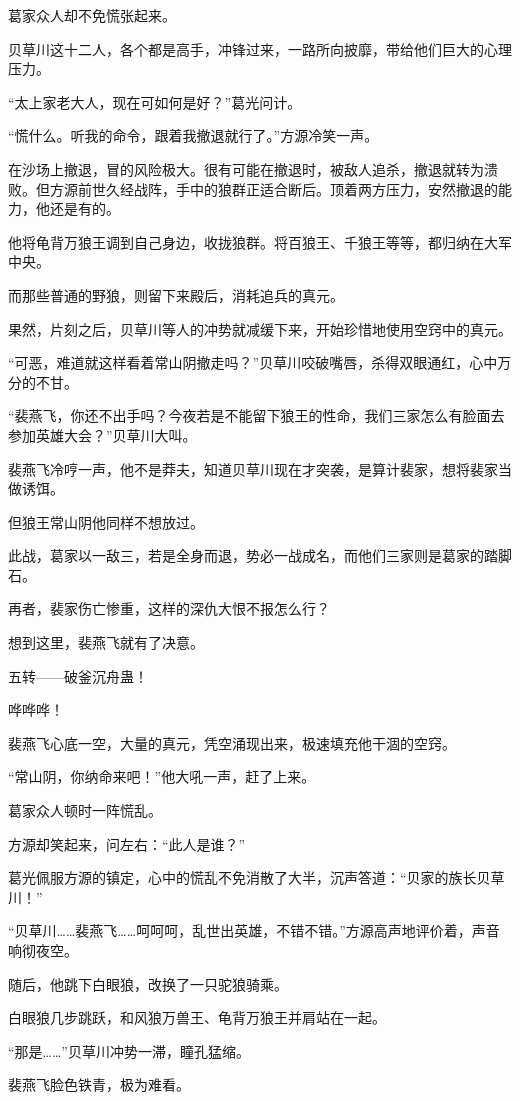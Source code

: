 \begin{this_body}
葛家众人却不免慌张起来。

贝草川这十二人，各个都是高手，冲锋过来，一路所向披靡，带给他们巨大的心理压力。

“太上家老大人，现在可如何是好？”葛光问计。

“慌什么。听我的命令，跟着我撤退就行了。”方源冷笑一声。

在沙场上撤退，冒的风险极大。很有可能在撤退时，被敌人追杀，撤退就转为溃败。但方源前世久经战阵，手中的狼群正适合断后。顶着两方压力，安然撤退的能力，他还是有的。

他将龟背万狼王调到自己身边，收拢狼群。将百狼王、千狼王等等，都归纳在大军中央。

而那些普通的野狼，则留下来殿后，消耗追兵的真元。

果然，片刻之后，贝草川等人的冲势就减缓下来，开始珍惜地使用空窍中的真元。

“可恶，难道就这样看着常山阴撤走吗？”贝草川咬破嘴唇，杀得双眼通红，心中万分的不甘。

“裴燕飞，你还不出手吗？今夜若是不能留下狼王的性命，我们三家怎么有脸面去参加英雄大会？”贝草川大叫。

裴燕飞冷哼一声，他不是莽夫，知道贝草川现在才突袭，是算计裴家，想将裴家当做诱饵。

但狼王常山阴他同样不想放过。

此战，葛家以一敌三，若是全身而退，势必一战成名，而他们三家则是葛家的踏脚石。

再者，裴家伤亡惨重，这样的深仇大恨不报怎么行？

想到这里，裴燕飞就有了决意。

五转——破釜沉舟蛊！

哗哗哗！

裴燕飞心底一空，大量的真元，凭空涌现出来，极速填充他干涸的空窍。

“常山阴，你纳命来吧！”他大吼一声，赶了上来。

葛家众人顿时一阵慌乱。

方源却笑起来，问左右：“此人是谁？”

葛光佩服方源的镇定，心中的慌乱不免消散了大半，沉声答道：“贝家的族长贝草川！”

“贝草川……裴燕飞……呵呵呵，乱世出英雄，不错不错。”方源高声地评价着，声音响彻夜空。

随后，他跳下白眼狼，改换了一只驼狼骑乘。

白眼狼几步跳跃，和风狼万兽王、龟背万狼王并肩站在一起。

“那是……”贝草川冲势一滞，瞳孔猛缩。

裴燕飞脸色铁青，极为难看。


\end{this_body}
